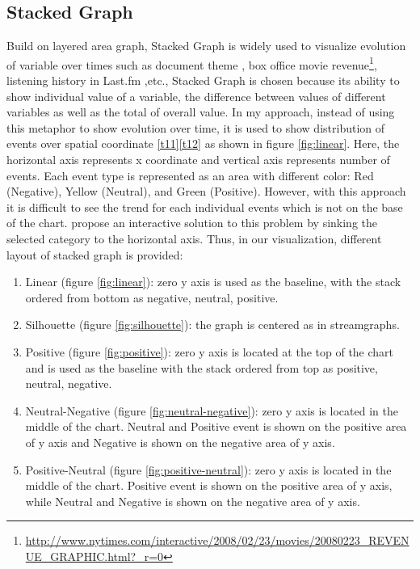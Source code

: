 \subsection{Stacked Graph}
Build on layered area graph, Stacked Graph is widely used to visualize evolution of variable over times such as document theme \cite{havre}, box office movie revenue\footnote{\url{http://www.nytimes.com/interactive/2008/02/23/movies/20080223_REVENUE_GRAPHIC.html?_r=0}}, listening history in Last.fm \cite{byron},etc., Stacked Graph is chosen because its ability to show individual value of a variable, the difference between values of different variables as well as the total of overall value. In my approach, instead of using this metaphor to show evolution over time, it is used to show distribution of events over spatial coordinate \ref{t11}\ref{t12} as shown in figure \ref{fig:linear}. Here, the horizontal axis represents x coordinate and vertical axis represents number of events. Each event type is represented as an area with different color: Red (Negative), Yellow (Neutral), and Green (Positive). However, with this approach it is difficult to see the trend for each individual events which is not on the base of the chart. \cite{alan} propose an interactive solution to this problem by sinking the selected category to the horizontal axis. Thus, in our visualization, different layout of stacked graph is provided: 
\begin{enumerate}
  \item Linear (figure \ref{fig:linear}): zero y axis is used as the baseline, with the stack ordered from bottom as negative, neutral, positive.
  \item Silhouette (figure \ref{fig:silhouette}): the graph is centered as in streamgraphs.
  \item Positive (figure \ref{fig:positive}): zero y axis is located at the top of the chart and is used as the baseline with the stack ordered from top as positive, neutral, negative.
  \item Neutral-Negative (figure \ref{fig:neutral-negative}): zero y axis is located in the middle of the chart. Neutral and Positive event is shown on the positive area of y axis and Negative is shown on the negative area of y axis.
  \item Positive-Neutral (figure \ref{fig:positive-neutral}): zero y axis is located in the middle of the chart. Positive event is shown on the positive area of y axis, while Neutral and Negative is shown on the negative area of y axis.
\end{enumerate}

